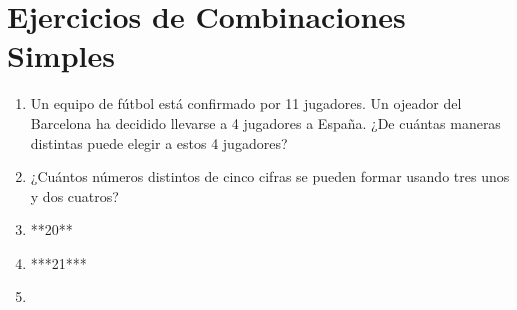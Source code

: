 \section{Ejercicios de Combinaciones Simples}
\begin{enumerate}
    \item Un equipo de fútbol está confirmado por 11 jugadores. Un ojeador del Barcelona ha decidido llevarse a 4 jugadores a España. ¿De cuántas maneras distintas puede elegir a estos 4 jugadores?
    \item ¿Cuántos números distintos de cinco cifras se pueden formar usando tres unos y dos cuatros?
    \item **20**
    \item ***21***
    \item 
\end{enumerate}
